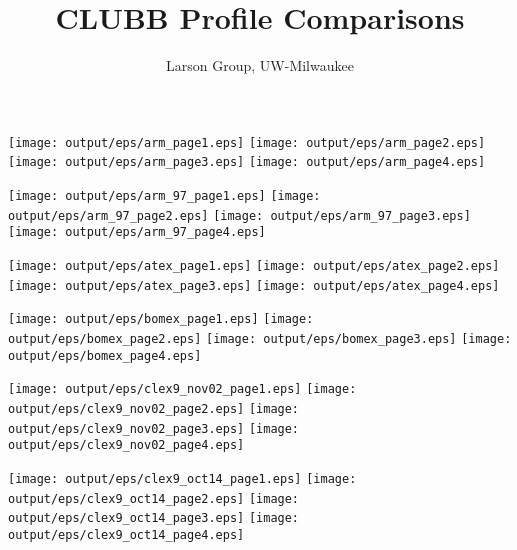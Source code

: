 \documentclass[11pt]{article}
\title{CLUBB Profile Comparisons}
\author{Larson Group, UW-Milwaukee}
\begin{document}
\begin{center}

\texttt{[image: output/eps/arm\_page1.eps]}
\texttt{[image: output/eps/arm\_page2.eps]}
\texttt{[image: output/eps/arm\_page3.eps]}
\texttt{[image: output/eps/arm\_page4.eps]}
\end{center}
\newpage

\begin{center}

\texttt{[image: output/eps/arm\_97\_page1.eps]}
\texttt{[image: output/eps/arm\_97\_page2.eps]}
\texttt{[image: output/eps/arm\_97\_page3.eps]}
\texttt{[image: output/eps/arm\_97\_page4.eps]}

\end{center}
\newpage

\begin{center}

\texttt{[image: output/eps/atex\_page1.eps]}
\texttt{[image: output/eps/atex\_page2.eps]}
\texttt{[image: output/eps/atex\_page3.eps]}
\texttt{[image: output/eps/atex\_page4.eps]}
\end{center}
\newpage


\begin{center}

\texttt{[image: output/eps/bomex\_page1.eps]}
\texttt{[image: output/eps/bomex\_page2.eps]}
\texttt{[image: output/eps/bomex\_page3.eps]}
\texttt{[image: output/eps/bomex\_page4.eps]}
\end{center}
\newpage

\begin{center}

\texttt{[image: output/eps/clex9\_nov02\_page1.eps]}
\texttt{[image: output/eps/clex9\_nov02\_page2.eps]}
\texttt{[image: output/eps/clex9\_nov02\_page3.eps]}
\texttt{[image: output/eps/clex9\_nov02\_page4.eps]}
\end{center}
\newpage

\begin{center}

\texttt{[image: output/eps/clex9\_oct14\_page1.eps]}
\texttt{[image: output/eps/clex9\_oct14\_page2.eps]}
\texttt{[image: output/eps/clex9\_oct14\_page3.eps]}
\texttt{[image: output/eps/clex9\_oct14\_page4.eps]}
\end{center}
\newpage
\end{document}
